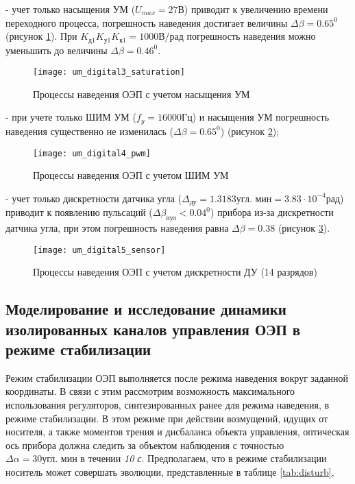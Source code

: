 - учет только насыщения УМ ($U_{max} = 27 \textit{В}$) приводит к увеличению времени переходного процесса, погрешность наведения достигает величины $\varDelta \beta = 0.65^0$ (рисунок \ref{fig:um_digital3}). При $K_{\textit{д1}} K_{\textit{у1}} K_{\textit{к1}} = 1000 \textit{В/рад}$ погрешность наведения можно уменьшить до величины  $\varDelta \beta = 0.46^0$. \par


\begin{figure}[ht]
	\centering
	\texttt{[image: um\_digital3\_saturation]} 
	\caption{Процессы наведения ОЭП с учетом насыщения УМ}
	\label{fig:um_digital3}
\end{figure}

- при учете только ШИМ УМ ($f_y = 16000 \textit{Гц}$) и насыщения УМ погрешность наведения существенно не изменилась ($\varDelta \beta = 0.65^0$) (рисунок \ref{fig:um_digital4});\par

\begin{figure}[ht]
	\centering
	\texttt{[image: um\_digital4\_pwm]} 
	\caption{Процессы наведения ОЭП с учетом ШИМ УМ}
	\label{fig:um_digital4}
\end{figure}


- учет только дискретности датчика угла ($\varDelta_{\textit{ду}} = 1.3183 \textit{угл. мин} = 3.83 \cdot 10^{-4} \textit{рад}$) приводит к появлению пульсаций ($\varDelta \beta_{\textit{пул}} < 0.04^0$) прибора из-за дискретности датчика угла, при этом погрешность наведения равна $\varDelta \beta = 0.38$ (рисунок \ref{fig:um_digital5}).\par

\begin{figure}[ht]
	\centering
	\texttt{[image: um\_digital5\_sensor]} 
	\caption{Процессы наведения ОЭП с учетом дискретности ДУ (14 разрядов)}
	\label{fig:um_digital5}
\end{figure}

\subsection{Моделирование и исследование динамики изолированных каналов управления ОЭП в режиме стабилизации} \label{ch:ch4/sect6}

Режим стабилизации ОЭП выполняется после режима наведения вокруг заданной координаты. В связи с этим рассмотрим возможность максимального использования регуляторов, синтезированных ранее для режима наведения, в режиме стабилизации. В этом режиме при действии возмущений, идущих от носителя, а также моментов трения и дисбаланса  объекта управления, оптическая ось прибора должна следить за объектом наблюдения с точностью $\varDelta \alpha = 30 \textit{угл. мин}$ в течении \textit{10 с}. Предполагаем, что в режиме стабилизации носитель может совершать эволюции, представленные в таблице \ref{tab:disturb}, 

